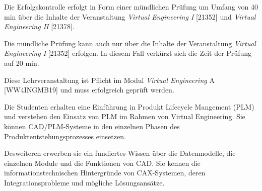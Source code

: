\begin{course}

\setdoclanguagegerman
{}



\coursehead


\label{cour_7503.dp_997}


\begin{styleenv}
\begin{assessment}
Die Erfolgskontrolle erfolgt in Form einer mündlichen Prüfung um Umfang von 40 min über die Inhalte der Veranstaltung \emph{Virtual Engineering I} [21352] und \emph{Virtual Engineering II} [21378].

 

Die mündliche Prüfung kann auch nur über die Inhalte der Veranstaltung \emph{Virtual Engineering I} [21352] erfolgen. In diesem Fall verkürzt sich die Zeit der Prüfung auf 20 min.


\end{assessment}

\begin{conditions}Diese Lehrveranstaltung ist Pflicht im Modul \emph{Virtual Engineering} A [WW4INGMB19] und muss erfolgreich geprüft werden.

\end{conditions}


\end{styleenv}

\begin{learningoutcomes}
Die Studenten erhalten eine Einführung in Produkt Lifecycle Mangement (PLM) und verstehen den Einsatz von PLM im Rahmen von Virtual Engineering. Sie können CAD/PLM-Systeme in den einzelnen Phasen des Produktentstehungsprozesses einsetzen.

 

Desweiteren erwerben sie ein fundiertes Wissen über die Datenmodelle, die einzelnen Module und die Funktionen von CAD. Sie kennen die informationstechnischen Hintergründe von CAX-Systemen, deren Integrationsprobleme und mögliche Lösungsansätze.


\end{learningoutcomes}
\end{course}
